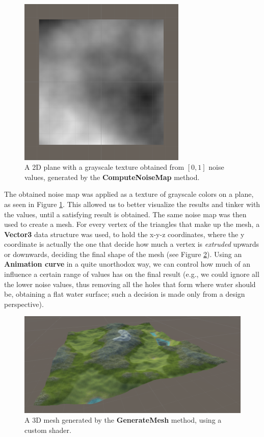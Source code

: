\begin{figure}[htp]
    \centering
    \includegraphics[width = 8cm]{figures/terraPlane.png}
    \caption{A 2D plane with a grayscale texture obtained from \([0, 1]\) noise values, generated by the \textbf{ComputeNoiseMap} method.}
    \label{fig:terraPlane}
\end{figure}

The obtained noise map was applied as a texture of grayscale colors on a plane, as seen in Figure \ref{fig:terraPlane}. This allowed us to better visualize the results and tinker with the values, until a satisfying result is obtained. The same noise map was then used to create a mesh. For every vertex of the triangles that make up the mesh, a \textbf{Vector3} data structure was used, to hold the x-y-z coordinates, where the y coordinate is actually the one that decide how much a vertex is \textit{extruded} upwards or downwards, deciding the final shape of the mesh (see Figure \ref{fig:terraMesh}). Using an \textbf{Animation curve} in a quite unorthodox way, we can control how much of an influence a certain range of values has on the final result (e.g., we could ignore all the lower noise values, thus removing all the holes that form where water should be, obtaining a flat water surface; such a decision is made only from a design perspective).

\begin{figure}[htp]
    \centering
    \includegraphics[width = 16cm]{figures/terraMesh.png}
    \caption{A 3D mesh generated by the \textbf{GenerateMesh} method, using a custom shader.}
    \label{fig:terraMesh}
\end{figure}

